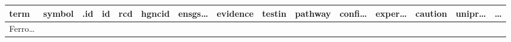 \documentclass[
]{article}
\begin{document}
\begin{longtable}[]{@{}lllllllllllllll@{}}
\midrule
\endfirsthead
\toprule
\begin{minipage}[b]{0.05\columnwidth}\raggedright
term\strut
\end{minipage} & \begin{minipage}[b]{0.04\columnwidth}\raggedright
symbol\strut
\end{minipage} & \begin{minipage}[b]{0.04\columnwidth}\raggedright
.id\strut
\end{minipage} & \begin{minipage}[b]{0.02\columnwidth}\raggedright
id\strut
\end{minipage} & \begin{minipage}[b]{0.05\columnwidth}\raggedright
rcd\strut
\end{minipage} & \begin{minipage}[b]{0.05\columnwidth}\raggedright
hgncid\strut
\end{minipage} & \begin{minipage}[b]{0.05\columnwidth}\raggedright
ensgs\ldots{}\strut
\end{minipage} & \begin{minipage}[b]{0.05\columnwidth}\raggedright
evidence\strut
\end{minipage} & \begin{minipage}[b]{0.04\columnwidth}\raggedright
testin\strut
\end{minipage} & \begin{minipage}[b]{0.05\columnwidth}\raggedright
pathway\strut
\end{minipage} & \begin{minipage}[b]{0.05\columnwidth}\raggedright
confi\ldots{}\strut
\end{minipage} & \begin{minipage}[b]{0.05\columnwidth}\raggedright
exper\ldots{}\strut
\end{minipage} & \begin{minipage}[b]{0.05\columnwidth}\raggedright
caution\strut
\end{minipage} & \begin{minipage}[b]{0.05\columnwidth}\raggedright
unipr\ldots{}\strut
\end{minipage} & \begin{minipage}[b]{0.02\columnwidth}\raggedright
\ldots{}\strut
\end{minipage}\tabularnewline
\midrule
\endhead
\begin{minipage}[t]{0.05\columnwidth}\raggedright
Ferro\ldots{}\strut
\end{minipage} & \begin{minipage}[t]{0.04\columnwidth}\raggedright

\end{minipage}
\end{longtable}
\end{document}
